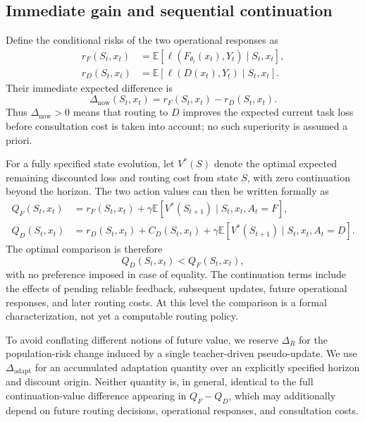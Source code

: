 \subsection{Immediate gain and sequential continuation}

Define the conditional risks of the two operational responses as
\begin{align}
    r_F(S_t,x_t)
    &=
    \mathbb E\!\left[
        \ell(F_{\theta_t}(x_t),Y_t)
        \mid S_t,x_t
    \right],
    \\
    r_D(S_t,x_t)
    &=
    \mathbb E\!\left[
        \ell(D(x_t),Y_t)
        \mid S_t,x_t
    \right].
\end{align}
Their immediate expected difference is
\begin{equation}
    \Delta_{\mathrm{now}}(S_t,x_t)
    =
    r_F(S_t,x_t)-r_D(S_t,x_t).
    \label{eq:general-immediate-gain}
\end{equation}
Thus $\Delta_{\mathrm{now}}>0$ means that routing to $D$ improves the
expected current task loss before consultation cost is taken into account;
no such superiority is assumed a priori.

For a fully specified state evolution, let $V^*(S)$ denote the optimal
expected remaining discounted loss and routing cost from state $S$, with
zero continuation beyond the horizon. The two action values can then be
written formally as
\begin{align}
    Q_F(S_t,x_t)
    &=
    r_F(S_t,x_t)
    +
    \gamma
    \mathbb E\!\left[
        V^*(S_{t+1})
        \mid S_t,x_t,A_t=F
    \right],
    \\
    Q_D(S_t,x_t)
    &=
    r_D(S_t,x_t)
    +
    C_D(S_t,x_t)
    +
    \gamma
    \mathbb E\!\left[
        V^*(S_{t+1})
        \mid S_t,x_t,A_t=D
    \right].
\end{align}
The optimal comparison is therefore
\begin{equation}
    Q_D(S_t,x_t)<Q_F(S_t,x_t),
\end{equation}
with no preference imposed in case of equality. The continuation terms
include the effects of pending reliable feedback, subsequent updates,
future operational responses, and later routing costs. At this level the
comparison is a formal characterization, not yet a computable routing
policy.

To avoid conflating different notions of future value, we reserve
$\Delta_R$ for the population-risk change induced by a single
teacher-driven pseudo-update. We use $\Delta_{\mathrm{adapt}}$ for an
accumulated adaptation quantity over an explicitly specified horizon and
discount origin. Neither quantity is, in general, identical to the full
continuation-value difference appearing in $Q_F-Q_D$, which may additionally
depend on future routing decisions, operational responses, and consultation
costs.

